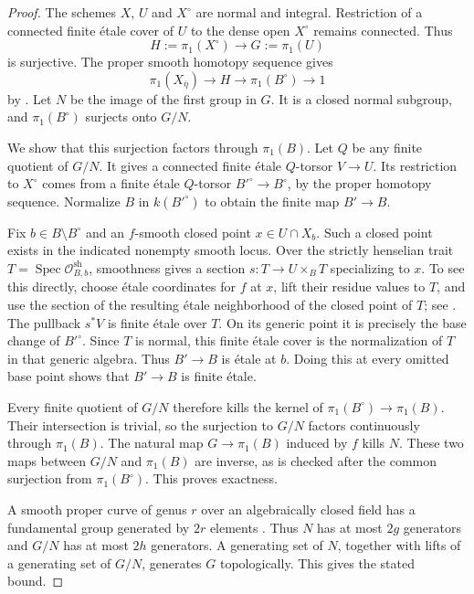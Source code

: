 \begin{proof}
The schemes $X$, $U$ and $X^\circ$ are normal and integral.
Restriction of a connected finite \'etale cover of $U$ to the
dense open $X^\circ$ remains connected.  Thus
\[
 H:=\pi_1(X^\circ)\longrightarrow G:=\pi_1(U)
\]
is surjective.  The proper smooth homotopy sequence gives
\[
 \pi_1(X_{\overline\eta})\longrightarrow H
       \longrightarrow\pi_1(B^\circ)\longrightarrow1
\]
by \cite[X, Corollary 1.4, p. 263]{SGA1}.  Let $N$ be the image
of the first group in $G$.  It is a closed normal subgroup,
and $\pi_1(B^\circ)$ surjects onto $G/N$.

We show that this surjection factors through $\pi_1(B)$.
Let $Q$ be any finite quotient of $G/N$.  It gives a connected
finite \'etale $Q$-torsor $V\to U$.  Its restriction to
$X^\circ$ comes from a finite \'etale $Q$-torsor
$B'^\circ\to B^\circ$, by the proper homotopy sequence.
Normalize $B$ in $k(B'^\circ)$ to obtain the finite map
$B'\to B$.

Fix $b\in B\setminus B^\circ$ and an $f$-smooth closed point
$x\in U\cap X_b$.  Such a closed point exists in the indicated
nonempty smooth locus.  Over the strictly henselian trait
$T=\operatorname{Spec}\mathcal O^{\mathrm{sh}}_{B,b}$, smoothness
gives a section $s:T\to U\times_B T$ specializing to $x$.
To see this directly, choose \'etale coordinates for $f$ at $x$,
lift their residue values to $T$, and use the section of the
resulting \'etale neighborhood of the closed point of $T$;
see \cite[tags 054L and 03QO]{C_StacksFibration}.
The pullback $s^*V$ is finite \'etale over $T$.  On its generic
point it is precisely the base change of $B'^\circ$.
Since $T$ is normal, this finite \'etale cover is the
normalization of $T$ in that generic algebra.  Thus $B'\to B$
is \'etale at $b$.  Doing this at every omitted base point
shows that $B'\to B$ is finite \'etale.

Every finite quotient of $G/N$ therefore kills the kernel of
$\pi_1(B^\circ)\to\pi_1(B)$.  Their intersection is trivial,
so the surjection to $G/N$ factors continuously through
$\pi_1(B)$.  The natural map $G\to\pi_1(B)$ induced by $f$
kills $N$.  These two maps between $G/N$ and $\pi_1(B)$ are
inverse, as is checked after the common surjection from
$\pi_1(B^\circ)$.  This proves exactness.

A smooth proper curve of genus $r$ over an algebraically closed
field has a fundamental group generated by $2r$ elements
\cite[X, Theorem 2.6, pp. 272--273]{SGA1}.
Thus $N$ has at most $2g$ generators and $G/N$ has at most
$2h$ generators.  A generating set of $N$, together with lifts
of a generating set of $G/N$, generates $G$ topologically.
This gives the stated bound.
\end{proof}

